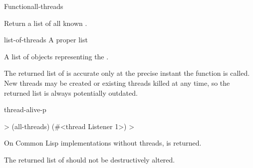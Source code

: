 \begin{functiondoc}{Function}{all-threads}{\noargs{} 
    \returns{} }
%

\fnsyntax

\fnpurpose Return a list of all known .

\fnpackage {}

\fnmodule {}

\fnargs
\begin{args}{list-of-threads}
 A proper list
\end{args}

\fnreturns A list of objects representing the .

\fndescription The returned list of  is accurate only at the
precise instant the  function is called.  New
threads may be created or existing threads killed at any time, so the returned
list is always potentially outdated.

\begin{alsos}{thread-alive-p}
\also[threadp]
\end{alsos}

\fnexample
%
\W\supp
\begin{example}
  > (all-threads)
  (#<thread Listener 1>)
  >
\end{example}

\fnnotes On Common Lisp implementations without threads, \nil{} is returned.

The returned list of  should not be destructively
altered.

\end{functiondoc}


